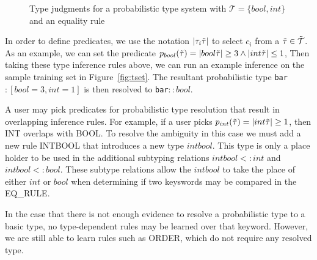 {
\setlength{\abovecaptionskip}{-.05pt}
\setlength{\belowcaptionskip}{-15pt}
\begin{figure}
\caption{Type judgments for a probabilistic type system with $\mathcal{T} = \{bool,int\}$ and an equality rule}
\label{fig:ptypes}
\end{figure}
}

In order to define predicates, we use the notation $|\tau_i\tilde{\tau}|$ to select $c_i$ from a $\tilde{\tau} \in \tilde{\mathcal{T}}$.
As an example, we can set the predicate $p_{bool}(\tilde{\tau})= |bool\tilde{\tau}| \geq 3 \land |int\tilde{\tau}| \leq 1$,
Then taking these type inference rules above, we can run an example inference on the sample training set in Figure~\ref{fig:tset}.
The resultant probabilistic type \texttt{bar}$:[bool=3,int=1]$ is then resolved to \texttt{bar}$::bool$.
 
A user may pick predicates for probabilistic type resolution that result in overlapping inference rules.
For example, if a user picks $p_{int}(\tilde{\tau})= |int\tilde{\tau}| \geq 1$, then {\scriptsize INT} overlaps with {\scriptsize BOOL}.
To resolve the ambiguity in this case we must add a new rule {\scriptsize INTBOOL} that introduces a new type $intbool$.
This type is only a place holder to be used in the additional subtyping relations $intbool <: int$ and $intbool <: bool$.
These subtype relations allow the $intbool$ to take the place of either $int$ or $bool$ when determining if two keyswords may be compared in the {\scriptsize EQ\_RULE}.


In the case that there is not enough evidence to resolve a probabilistic type to a basic type, no type-dependent rules may be learned over that keyword.
However, we are still able to learn rules such as {\scriptsize ORDER}, which do not require any resolved type. 



